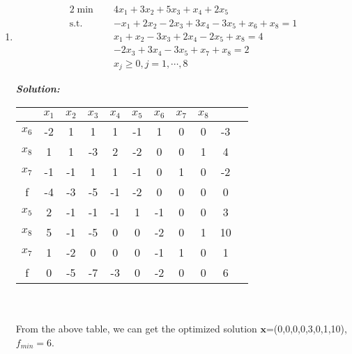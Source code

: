 \documentclass[paper=a4, fontsize=11pt]{scrartcl} %
\numberwithin{equation}{section} %
\numberwithin{figure}{section} %
\numberwithin{table}{section} %
\begin{document}
\begin{enumerate}
\item
\begin{alignat}{2}          \nonumber
\min\quad & 4x_1+3x_2+5x_3+x_4+2x_5\\    \nonumber
\mbox{s.t.}\quad            \nonumber
& -x_1+2x_2-2x_3+3x_4-3x_5+x_6+x_8 = 1\\        \nonumber
& x_1+x_2-3x_3+2x_4-2x_5+x_8 = 4\\         \nonumber
& -2x_3+3x_4-3x_5+x_7+x_8 = 2\\         \nonumber
& x_j\geq0,j=1,\cdots,8
\end{alignat}

\emph{\textbf{Solution:}}\\

\begin{tabular}{|c|c|c|c|c|c|c|c|c|c|c|}
\hline &$x_1$&$x_2$&$x_3$&$x_4$&$x_5$&$x_6$&$x_7$&$x_8$&\\
\hline$x_6$&-2&1&1&1&\Large{\textcircled{\small{-1}}}&1&0&0&-3\\
\hline$x_8$&1&1&-3&2&-2&0&0&1&4\\
\hline$x_7$&-1&-1&1&1&-1&0&1&0&-2\\
\hline f&-4&-3&-5&-1&-2&0&0&0&0\\
\hline
\hline$x_5$&2&-1&-1&-1&1&-1&0&0&3\\
\hline$x_8$&5&-1&-5&0&0&-2&0&1&10\\
\hline$x_7$&1&-2&0&0&0&-1&1&0&1\\
\hline f&0&-5&-7&-3&0&-2&0&0&6\\
\hline
\end{tabular}
\\\\
From the above table, we can get the optimized solution $\mathbf{x}$=(0,0,0,0,3,0,1,10),$f_{min}=6$.

\end{enumerate}
\end{document}
